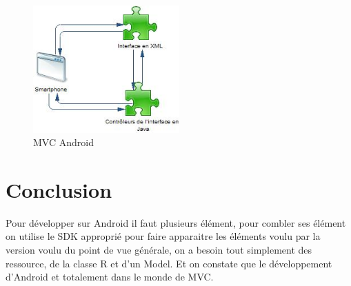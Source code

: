 	\begin{figure}[!h]
    	\center
    		\includegraphics[width=0.5\textwidth]{image/strucbasique.jpg}
   		\caption{MVC Android}
    	\label{MVC Android}
	\end{figure}
	
\section{Conclusion}
Pour développer sur Android  il faut plusieurs élément, pour combler ses élément on utilise le SDK approprié pour faire apparaitre les éléments voulu par la version voulu du point de vue générale, on a besoin tout simplement des ressource, de la classe R et d’un Model. Et on constate que le développement d’Android et totalement dans le monde de MVC.


















